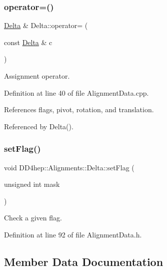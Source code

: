 \subsubsection{\texorpdfstring{operator=()}{operator=()}}
{\footnotesize\ttfamily \hyperlink{class_d_d4hep_1_1_alignments_1_1_delta}{Delta} \& Delta\+::operator= (\begin{DoxyParamCaption}\item[{const \hyperlink{class_d_d4hep_1_1_alignments_1_1_delta}{Delta} \&}]{c }\end{DoxyParamCaption})}



Assignment operator. 



Definition at line 40 of file Alignment\+Data.\+cpp.



References flags, pivot, rotation, and translation.



Referenced by Delta().

\hypertarget{class_d_d4hep_1_1_alignments_1_1_delta_a395852746451e6e2de16e829161a5ac3}{}\label{class_d_d4hep_1_1_alignments_1_1_delta_a395852746451e6e2de16e829161a5ac3} 
\subsubsection{\texorpdfstring{set\+Flag()}{setFlag()}}
{\footnotesize\ttfamily void D\+D4hep\+::\+Alignments\+::\+Delta\+::set\+Flag (\begin{DoxyParamCaption}\item[{unsigned int}]{mask }\end{DoxyParamCaption})\hspace{0.3cm}{\ttfamily [inline]}}



Check a given flag. 



Definition at line 92 of file Alignment\+Data.\+h.



\subsection{Member Data Documentation}
\hypertarget{class_d_d4hep_1_1_alignments_1_1_delta_a0d3375bd33c904430901e1ac3c1a1660}{}\label{class_d_d4hep_1_1_alignments_1_1_delta_a0d3375bd33c904430901e1ac3c1a1660} 
